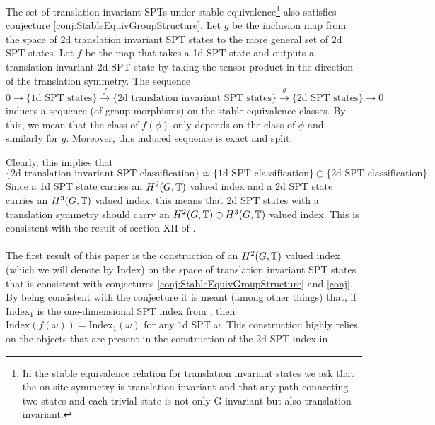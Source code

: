 \documentclass[11pt,a4paper,twoside]{article}
\numberwithin{equation}{section}
\begin{document}
	\begin{conjecture}\label{conj}
		The set of translation invariant SPTs under stable equivalence\footnote{In the stable equivalence relation for translation invariant states we ask that the on-site symmetry is translation invariant and that any path connecting two states and each trivial state is not only G-invariant but also translation invariant.} also satisfies conjecture \ref{conj:StableEquivGroupStructure}. Let $g$ be the inclusion map from the space of 2d translation invariant SPT states to the more general set of 2d SPT states. Let $f$ be the map that takes a 1d SPT state and outputs a translation invariant 2d SPT state by taking the tensor product in the direction of the translation symmetry. The sequence
		\begin{equation}
			0\rightarrow\{\text{1d SPT states}\}\stackrel{f}{\rightarrow}\{\text{2d translation invariant SPT states}\}\stackrel{g}{\rightarrow}\{\text{2d SPT states}\}\rightarrow 0
		\end{equation}
		induces a sequence (of group morphisms) on the stable equivalence classes. By this, we mean that the class of $f(\phi)$ only depends on the class of $\phi$ and similarly for $g$. Moreover, this induced sequence is exact and split.
	\end{conjecture}
	Clearly, this implies that
	\begin{equation}
		\{\text{2d translation invariant SPT classification}\}\simeq \{\text{1d SPT classification}\}\oplus \{\text{2d SPT classification}\}.
	\end{equation}
	Since a 1d SPT state carries an $H^2(G,\mathbb T)$ valued index and a 2d SPT state carries an $H^3(G,\mathbb T)$ valued index, this means that 2d SPT states with a translation symmetry should carry an $H^2(G,\mathbb T)\oplus H^3(G,\mathbb T)$ valued index. This is consistent with the result of section XII of \cite{Chen_2013}.
	\\\\
	The first result of this paper is the construction of an $H^2(G,\mathbb T)$ valued index (which we will denote by $\textrm{Index}$) on the space of translation invariant SPT states that is consistent with conjectures \ref{conj:StableEquivGroupStructure} and \ref{conj}. By being consistent with the conjecture it is meant (among other things) that, if $\textrm{Index}_1$ is the one-dimensional SPT index from \cite{ogata2019classification}, then $\textrm{Index}(f(\omega))=\textrm{Index}_1(\omega)$ for any 1d SPT $\omega$. This construction highly relies on the objects that are present in the construction of the 2d SPT index in \cite{ogata2021h3gmathbb}.
\end{document}
